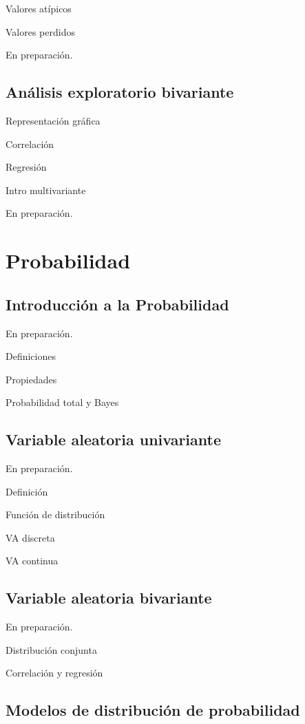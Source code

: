 \documentclass[
]{book}
\begin{document}
Valores atípicos

Valores perdidos

En preparación.

\hypertarget{aed-bi}{%
\chapter{Análisis exploratorio bivariante}\label{aed-bi}}

Representación gráfica

Correlación

Regresión

Intro multivariante

En preparación.

\hypertarget{part-probabilidad}{%
\part{Probabilidad}\label{part-probabilidad}}

\hypertarget{introp}{%
\chapter{Introducción a la Probabilidad}\label{introp}}

En preparación.

Definiciones

Propiedades

Probabilidad total y Bayes

\hypertarget{vauni}{%
\chapter{Variable aleatoria univariante}\label{vauni}}

En preparación.

Definición

Función de distribución

VA discreta

VA continua

\hypertarget{vabi}{%
\chapter{Variable aleatoria bivariante}\label{vabi}}

En preparación.

Distribución conjunta

Correlación y regresión

\hypertarget{modelos}{%
\chapter{Modelos de distribución de probabilidad}\label{modelos}}
\end{document}
